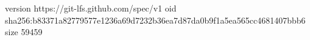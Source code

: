 version https://git-lfs.github.com/spec/v1
oid sha256:b83371a82779577e1236a69d7232b36ea7d87da0b9f1a5ea565cc4681407bbb6
size 59459
